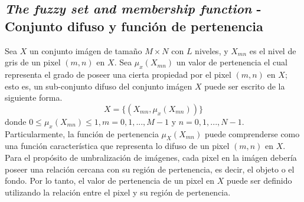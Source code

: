 \documentclass[preprint,12pt]{elsarticle}
\begin{document}
\subsection{\textit{The fuzzy set and membership function} - Conjunto difuso y función de pertenencia}

Sea $X$ un conjunto imágen de tamaño $M \times N$ con $L$ niveles, y $X_{mn}$ es el nivel de gris de un pixel $(m, n)$ en $X$.
%
Sea $\mu_x(X_{mn})$ un valor de pertenencia el cual representa el grado de poseer una cierta propiedad por el pixel $(m,n)$ en $X$; esto es, un sub-conjunto difuso del conjunto imágen $X$ puede ser escrito de la siguiente forma.
\begin{equation}
    X = \{ (X_{mn}, \mu_x(X_{mn}) )  \}
\end{equation}
donde $0 \leq \mu_x(X_{mn})\leq 1, m=0,1,...,M-1$  y $n=0,1,...,N-1$.
%
Particularmente, la función de pertenencia $\mu_X(X_{mn})$ puede comprenderse como una función característica que representa lo difuso de un pixel $(m,n)$ en $X$.
%
Para el propósito de umbralización de imágenes, cada pixel en la imágen debería poseer una relación cercana con su región de pertenencia, es decir, el objeto o el fondo.
%
Por lo tanto, el valor de pertenencia de un pixel en $X$ puede ser definido utilizando la relación entre el pixel y su región de pertenencia.
%
\end{document}
